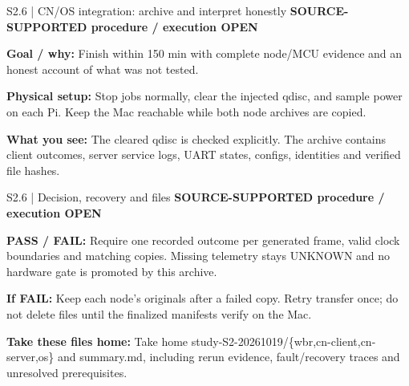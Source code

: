 \documentclass[aspectratio=169,12pt,t]{beamer}
\makeatletter
\newcommand{\takeaway}[1]{\global\beamer@framebottomskip=0pt\par\medskip\begin{beamercolorbox}[wd=\linewidth,sep=0pt]{block body}%
  \begin{tabular}{@{}!{\color{teal}\vrule width 3pt}p{\dimexpr\linewidth-22pt\relax}@{}}\normalsize\strut #1\strut\end{tabular}%
  \end{beamercolorbox}\par}
\newcommand{\evidence}[1]{{\small\bfseries\color{teal!70!black}#1}\par\medskip}
\makeatother
\begin{document}
\begin{frame}{S2.6 | CN/OS integration: archive and interpret honestly}
\evidence{SOURCE-SUPPORTED procedure / execution OPEN}
\textbf{Goal / why:} Finish within 150 min with complete node/MCU evidence and an honest account of what was not tested.\par\medskip\textbf{Physical setup:} Stop jobs normally, clear the injected qdisc, and sample power on each Pi. Keep the Mac reachable while both node archives are copied.\par\medskip\textbf{What you see:} The cleared qdisc is checked explicitly. The archive contains client outcomes, server service logs, UART states, configs, identities and verified file hashes.
\end{frame}
\begin{frame}{S2.6 | Decision, recovery and files}
\evidence{SOURCE-SUPPORTED procedure / execution OPEN}
\textbf{PASS / FAIL:} Require one recorded outcome per generated frame, valid clock boundaries and matching copies. Missing telemetry stays UNKNOWN and no hardware gate is promoted by this archive.\par\medskip\textbf{If FAIL:} Keep each node’s originals after a failed copy. Retry transfer once; do not delete files until the finalized manifests verify on the Mac.\par\medskip\textbf{Take these files home:} Take home study-S2-20261019/\{wbr,cn-client,cn-server,os\} and summary.md, including rerun evidence, fault/recovery traces and unresolved prerequisites.
\end{frame}
\end{document}
